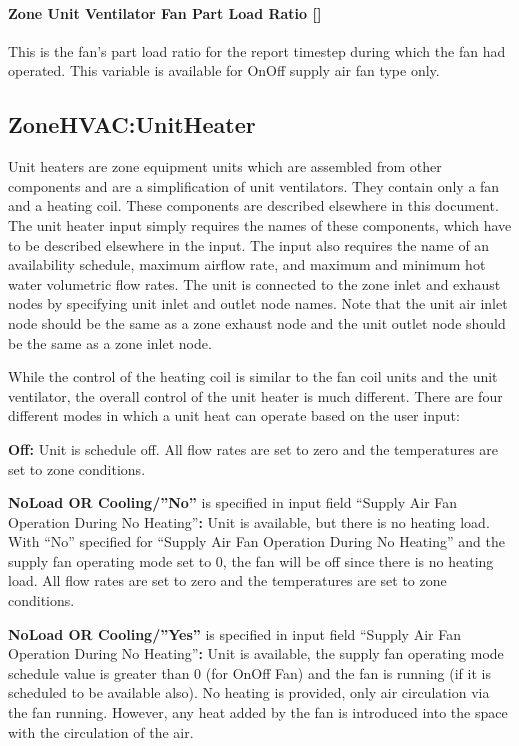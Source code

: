 \paragraph{Zone Unit Ventilator Fan Part Load Ratio {[]}}\label{zone-unit-ventilator-fan-part-load-ratio}

This is the fan's part load ratio for the report timestep during which the fan had operated. This variable is available for OnOff supply air fan type only.

\subsection{ZoneHVAC:UnitHeater}\label{zonehvacunitheater}

Unit heaters are zone equipment units which are assembled from other components and are a simplification of unit ventilators. They contain only a fan and a heating coil. These components are described elsewhere in this document. The unit heater input simply requires the names of these components, which have to be described elsewhere in the input. The input also requires the name of an availability schedule, maximum airflow rate, and maximum and minimum hot water volumetric flow rates. The unit is connected to the zone inlet and exhaust nodes by specifying unit inlet and outlet node names. Note that the unit air inlet node should be the same as a zone exhaust node and the unit outlet node should be the same as a zone inlet node.

While the control of the heating coil is similar to the fan coil units and the unit ventilator, the overall control of the unit heater is much different. There are four different modes in which a unit heat can operate based on the user input:

\textbf{Off:} Unit is schedule off. All flow rates are set to zero and the temperatures are set to zone conditions.

\textbf{NoLoad OR Cooling/''No''} is specified in input field ``Supply Air Fan Operation During No Heating''\textbf{:} Unit is available, but there is no heating load. With ``No'' specified for ``Supply Air Fan Operation During No Heating'' and the supply fan operating mode set to 0, the fan will be off since there is no heating load. All flow rates are set to zero and the temperatures are set to zone conditions.

\textbf{NoLoad OR Cooling/''Yes''} is specified in input field ``Supply Air Fan Operation During No Heating''\textbf{:} Unit is available, the supply fan operating mode schedule value is greater than 0 (for OnOff Fan) and the fan is running (if it is scheduled to be available also). No heating is provided, only air circulation via the fan running. However, any heat added by the fan is introduced into the space with the circulation of the air.

